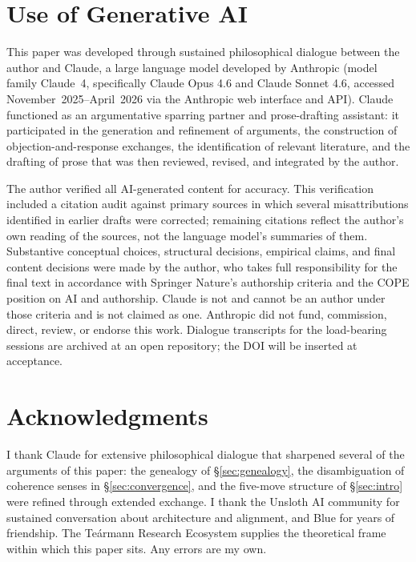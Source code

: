 \documentclass[11pt,a4paper,twocolumn]{article}
\begin{document}
\section*{Use of Generative AI}

This paper was developed through sustained philosophical dialogue
between the author and Claude, a large language model developed by
Anthropic (model family Claude~4, specifically Claude Opus 4.6 and
Claude Sonnet 4.6, accessed November~2025--April~2026 via the
Anthropic web interface and API). Claude functioned as an
argumentative sparring partner and prose-drafting assistant: it
participated in the generation and refinement of arguments, the
construction of objection-and-response exchanges, the identification
of relevant literature, and the drafting of prose that was then
reviewed, revised, and integrated by the author.

The author verified all AI-generated content for accuracy. This
verification included a citation audit against primary sources in
which several misattributions identified in earlier drafts were
corrected; remaining citations reflect the author's own reading of the
sources, not the language model's summaries of them. Substantive
conceptual choices, structural decisions, empirical claims, and
final content decisions were made by the author, who takes full
responsibility for the final text in accordance with Springer Nature's
authorship criteria and the COPE position on AI and authorship.
Claude is not and cannot be an author under those criteria and is
not claimed as one. Anthropic did not fund, commission, direct,
review, or endorse this work. Dialogue transcripts for the
load-bearing sessions are archived at an open repository; the DOI
will be inserted at acceptance.


\section*{Acknowledgments}

I thank Claude for extensive philosophical dialogue that sharpened
several of the arguments of this paper: the genealogy of
\S\ref{sec:genealogy}, the disambiguation of coherence senses in
\S\ref{sec:convergence}, and the five-move structure of
\S\ref{sec:intro} were refined through extended exchange. I thank
the Unsloth AI community for sustained conversation about
architecture and alignment, and Blue for years of friendship. The
Te\'armann Research Ecosystem supplies the theoretical frame within
which this paper sits. Any errors are my own.
\end{document}
